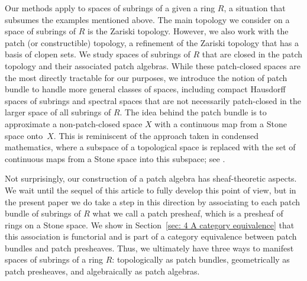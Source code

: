 \documentclass[11pt]{amsart}
\theoremstyle{definition}
\begin{document}
Our methods apply to spaces of subrings of a given a ring $R$, a situation that subsumes the examples mentioned above. The main topology we consider on a space of subrings of $R$ is the Zariski topology. However, we also work with the patch (or constructible) topology,  a refinement of the Zariski topology that has a basis of clopen sets. We study spaces of subrings of $R$ that are closed in the patch topology and their associated patch algebras. While these patch-closed spaces are the most directly tractable for our purposes, we introduce the notion of patch bundle to handle more general classes of spaces, including compact Hausdorff spaces of subrings and spectral spaces that are not necessarily patch-closed in the larger space of all subrings of $R$. The idea behind the patch bundle is to approximate a non-patch-closed space $X$ with a continuous map from a Stone space onto~$X$. This is reminiscent of the approach taken in condensed mathematics, where a subspace of a topological space is replaced with the set of continuous maps from a Stone space into this subspace; see \cite[Example 1.5, p.~8]{Sch}. 

Not surprisingly, our construction of a patch algebra has sheaf-theoretic aspects. We wait until the sequel of this article to fully develop this point of view, but in the present paper we do take a step in this direction by associating to each patch bundle of subrings of $R$ what we call a patch presheaf, which is a presheaf of rings on a Stone space. We show in Section~\ref{sec: 4 A category equivalence} that this association is functorial and is part of a category equivalence between patch bundles and patch presheaves. Thus, we ultimately have three ways to manifest spaces of subrings of a ring $R$: topologically as patch bundles, geometrically as patch presheaves, and algebraically as patch algebras. 
\end{document}
